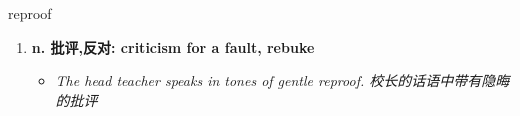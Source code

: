 
\begin{frame}
{\huge reproof}
\begin{center}
\begin{enumerate}\Large
  \item \textbf{n. 批评,反对: criticism for a fault, rebuke}
  \begin{itemize}
    \item \em{\Large{The head teacher speaks in tones of gentle reproof. 校长的话语中带有隐晦的批评}}
  \end{itemize}
\end{enumerate}
\end{center}
\end{frame}
